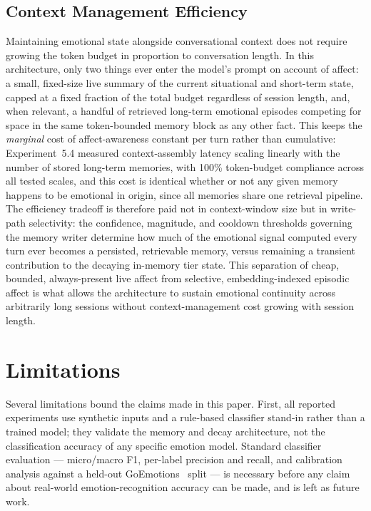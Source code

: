 \documentclass[graybox]{svmult}
\begin{document}
\subsection{Context Management Efficiency}
Maintaining emotional state alongside conversational context does not
require growing the token budget in proportion to conversation length.
In this architecture, only two things ever enter the model's prompt on
account of affect: a small, fixed-size live summary of the current
situational and short-term state, capped at a fixed fraction of the
total budget regardless of session length, and, when relevant, a handful
of retrieved long-term emotional episodes competing for space in the
same token-bounded memory block as any other fact. This keeps the
\emph{marginal} cost of affect-awareness constant per turn rather than
cumulative: Experiment~5.4 measured context-assembly latency scaling
linearly with the number of stored long-term memories, with 100\%
token-budget compliance across all tested scales, and this cost is
identical whether or not any given memory happens to be emotional in
origin, since all memories share one retrieval pipeline. The efficiency
tradeoff is therefore paid not in context-window size but in write-path
selectivity: the confidence, magnitude, and cooldown thresholds governing
the memory writer determine how much of the emotional signal computed
every turn ever becomes a persisted, retrievable memory, versus remaining
a transient contribution to the decaying in-memory tier state. This
separation of cheap, bounded, always-present live affect from selective,
embedding-indexed episodic affect is what allows the architecture to
sustain emotional continuity across arbitrarily long sessions without
context-management cost growing with session length.



\section{Limitations}

Several limitations bound the claims made in this paper. First, all
reported experiments use synthetic inputs and a rule-based classifier
stand-in rather than a trained model; they validate the memory and decay
architecture, not the classification accuracy of any specific emotion
model. Standard classifier evaluation --- micro/macro F1, per-label
precision and recall, and calibration analysis against a held-out
GoEmotions~\cite{demszky2020goemotions} split --- is necessary before any claim about real-world emotion-recognition accuracy can be made, and is left as future work. 
\end{document}
